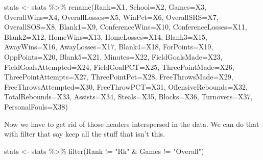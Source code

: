 \documentclass[
]{book}
\newenvironment{Shaded}{\begin{snugshade}}{\end{snugshade}}
\newcommand{\AttributeTok}[1]{\textcolor[rgb]{0.77,0.63,0.00}{#1}}
\newcommand{\FunctionTok}[1]{\textcolor[rgb]{0.00,0.00,0.00}{#1}}
\newcommand{\NormalTok}[1]{#1}
\newcommand{\OtherTok}[1]{\textcolor[rgb]{0.56,0.35,0.01}{#1}}
\newcommand{\SpecialCharTok}[1]{\textcolor[rgb]{0.00,0.00,0.00}{#1}}
\newcommand{\StringTok}[1]{\textcolor[rgb]{0.31,0.60,0.02}{#1}}
\begin{document}
\begin{Shaded}
\begin{Highlighting}[]
\NormalTok{stats }\OtherTok{\textless{}{-}}\NormalTok{ stats }\SpecialCharTok{\%\textgreater{}\%} \FunctionTok{rename}\NormalTok{(}\AttributeTok{Rank=}\NormalTok{X1, }\AttributeTok{School=}\NormalTok{X2, }\AttributeTok{Games=}\NormalTok{X3, }\AttributeTok{OverallWins=}\NormalTok{X4, }\AttributeTok{OverallLosses=}\NormalTok{X5, }\AttributeTok{WinPct=}\NormalTok{X6, }\AttributeTok{OverallSRS=}\NormalTok{X7, }\AttributeTok{OverallSOS=}\NormalTok{X8, }\AttributeTok{Blank1=}\NormalTok{X9, }\AttributeTok{ConferenceWins=}\NormalTok{X10, }\AttributeTok{ConferenceLosses=}\NormalTok{X11, }\AttributeTok{Blank2=}\NormalTok{X12, }\AttributeTok{HomeWins=}\NormalTok{X13, }\AttributeTok{HomeLosses=}\NormalTok{X14, }\AttributeTok{Blank3=}\NormalTok{X15, }\AttributeTok{AwayWins=}\NormalTok{X16, }\AttributeTok{AwayLosses=}\NormalTok{X17, }\AttributeTok{Blank4=}\NormalTok{X18, }\AttributeTok{ForPoints=}\NormalTok{X19, }\AttributeTok{OppPoints=}\NormalTok{X20, }\AttributeTok{Blank5=}\NormalTok{X21, }\AttributeTok{Minutes=}\NormalTok{X22, }\AttributeTok{FieldGoalsMade=}\NormalTok{X23, }\AttributeTok{FieldGoalsAttempted=}\NormalTok{X24, }\AttributeTok{FieldGoalPCT=}\NormalTok{X25, }\AttributeTok{ThreePointMade=}\NormalTok{X26, }\AttributeTok{ThreePointAttempts=}\NormalTok{X27, }\AttributeTok{ThreePointPct=}\NormalTok{X28, }\AttributeTok{FreeThrowsMade=}\NormalTok{X29, }\AttributeTok{FreeThrowsAttempted=}\NormalTok{X30, }\AttributeTok{FreeThrowPCT=}\NormalTok{X31, }\AttributeTok{OffensiveRebounds=}\NormalTok{X32, }\AttributeTok{TotalRebounds=}\NormalTok{X33, }\AttributeTok{Assists=}\NormalTok{X34, }\AttributeTok{Steals=}\NormalTok{X35, }\AttributeTok{Blocks=}\NormalTok{X36, }\AttributeTok{Turnovers=}\NormalTok{X37, }\AttributeTok{PersonalFouls=}\NormalTok{X38)}
\end{Highlighting}
\end{Shaded}

Now we have to get rid of those headers interspersed in the data. We can do that with filter that say keep all the stuff that isn't this.

\begin{Shaded}
\begin{Highlighting}[]
\NormalTok{stats }\OtherTok{\textless{}{-}}\NormalTok{ stats }\SpecialCharTok{\%\textgreater{}\%} \FunctionTok{filter}\NormalTok{(Rank }\SpecialCharTok{!=} \StringTok{"Rk"} \SpecialCharTok{\&}\NormalTok{ Games }\SpecialCharTok{!=} \StringTok{"Overall"}\NormalTok{) }
\end{Highlighting}
\end{Shaded}
\end{document}
